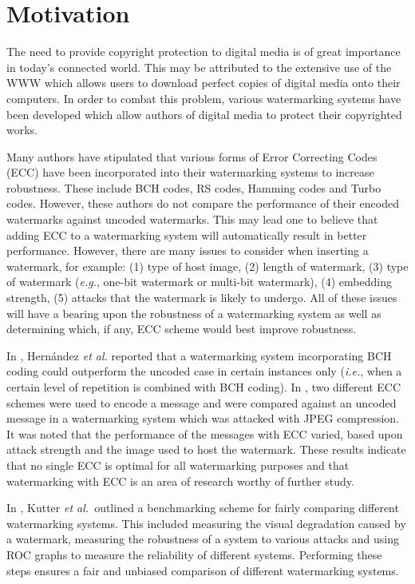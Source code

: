 \documentclass[12pt]{report}
\begin{document}
\section{Motivation}
The need to provide copyright protection to digital media is of great importance in 
today's connected world. 
This may be attributed to the extensive use of the WWW which allows users 
to download perfect
copies of digital media onto their computers. In order to combat this problem, various 
watermarking systems
have been developed which allow
authors of digital media to protect their
copyrighted works.


Many authors \cite{ECCb4:marvel2, ECCb4:wang, ECCb4:lang, ECCb4:egg1, ECCb4:volo, ECCb4:herr, ECCb4:huang}
have stipulated that various forms of Error Correcting Codes (ECC) have been incorporated
into their watermarking systems to increase robustness. 
These include BCH codes, RS codes, Hamming codes and Turbo codes.
However, these authors
do not compare the performance of their encoded watermarks against uncoded watermarks. This may lead
one to believe that adding ECC to a watermarking system will automatically result in better performance. However, there
are many issues to consider when inserting a watermark, for example: (1) type of host image, (2) length of watermark,
(3) type of watermark (\emph{e.g.}, one-bit watermark or multi-bit watermark), (4) embedding strength, (5) 
attacks that the watermark is likely to undergo. All of these issues will have a bearing upon the robustness of
a watermarking system as well as determining which, if any, ECC scheme would best improve robustness.

In \cite{ECCb4:th3, ECCb4:th4, ECCb4:th5}, Hern\'andez \emph{et al.} reported that a watermarking system 
incorporating BCH coding could outperform the uncoded case in certain instances only (\emph{i.e.},
when a certain level of repetition is combined with BCH coding).
In \cite{ECCb4:th6}, two different ECC schemes were used to encode a message and were compared against an uncoded message in a watermarking system
which was attacked with JPEG compression. It was noted that the performance of the messages with ECC varied,
based upon attack strength and the image used to host the watermark.
These results indicate that no single ECC is optimal for all watermarking purposes
and that watermarking with ECC is an area of research worthy of further study.

In \cite{petit99}, Kutter \emph{et al.}~outlined a benchmarking scheme for fairly comparing different
watermarking systems. This included measuring the visual degradation 
caused by a watermark, measuring the robustness of a system to various attacks and
using ROC graphs to measure the reliability of different systems.
Performing these steps ensures a fair and unbiased comparison of different watermarking systems.
\end{document}

